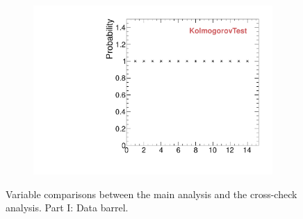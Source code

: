 \begin{figure}
\begin{subfigure}[b]{0.2\textwidth}
                \includegraphics[width=\textwidth]{Figures/VariablesComparison/Data_barrel_figs/KS}
                \label{fig:Data_barrel_KS}
        \end{subfigure}
        \caption{Variable comparisons between the main analysis and the cross-check analysis. Part I: Data barrel.}
        \label{fig:Data_barrel_figs}
\end{figure}


